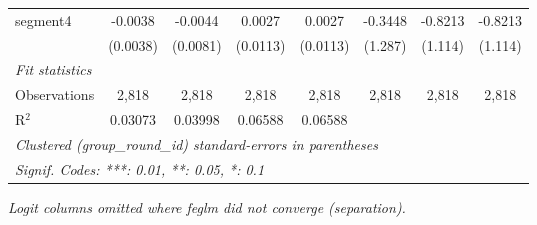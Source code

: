 \begin{tabular}{lccccccc}
   segment4                         & -0.0038               & -0.0044        & 0.0027          & 0.0027          & -0.3448         & -0.8213         & -0.8213\\   
                                    & (0.0038)              & (0.0081)       & (0.0113)        & (0.0113)        & (1.287)         & (1.114)         & (1.114)\\   
   \midrule
   \emph{Fit statistics}\\
   Observations                     & 2,818                 & 2,818          & 2,818           & 2,818           & 2,818           & 2,818           & 2,818\\  
   R$^2$                            & 0.03073               & 0.03998        & 0.06588         & 0.06588         &                 &                 & \\  
   \midrule \midrule
   \multicolumn{8}{l}{\emph{Clustered (group\_round\_id) standard-errors in parentheses}}\\
   \multicolumn{8}{l}{\emph{Signif. Codes: ***: 0.01, **: 0.05, *: 0.1}}\\
\end{tabular}
\par\endgroup
\footnotesize\textit{Logit columns omitted where feglm did not converge (separation).}\normalsize
